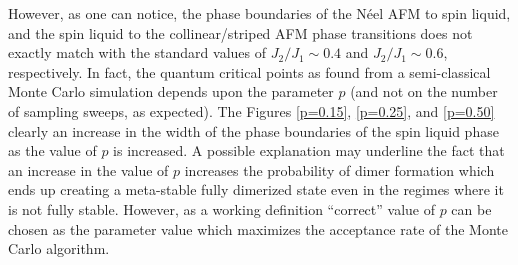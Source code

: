 \documentclass[../thesis_main.tex]{subfiles}
\begin{document}
\FloatBarrier \!\!\!\!\!\!\!\!\!\!\!
However, as one can notice, the phase boundaries of the Néel AFM to spin liquid, and the spin liquid to the collinear/striped AFM phase transitions does not exactly match with the standard values of $J_2/J_1 \sim 0.4$ and $J_2/J_1 \sim 0.6$, respectively. In fact, the quantum critical points as found from a semi-classical Monte Carlo simulation depends upon the parameter $p$ (and not on the number of sampling sweeps, as expected). The Figures \ref{p=0.15}, \ref{p=0.25}, and \ref{p=0.50} clearly an increase in the width of the phase boundaries of the spin liquid phase as the value of $p$ is increased. A possible explanation may underline the fact that an increase in the value of $p$ increases the probability of dimer formation which ends up creating a meta-stable fully dimerized state even in the regimes where it is not fully stable. However, as a working definition ``correct'' value of $p$ can be chosen as the parameter value which maximizes the acceptance rate of the Monte Carlo algorithm.
\end{document}
